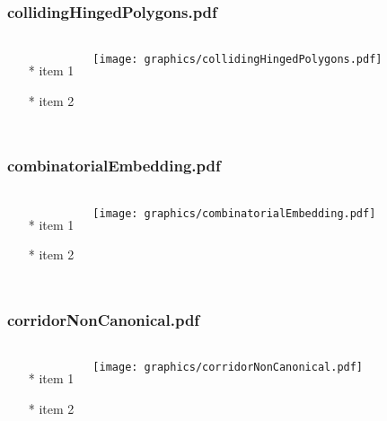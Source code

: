 \begin{frame} \frametitle{collidingHingedPolygons.pdf}
    \begin{columns}[c]
        \begin{itemize}
            \item[*] item 1
            \item[*] item 2
        \end{itemize}
        \begin{minipage}{\linewidth}
            \begin{center}
            \texttt{[image: graphics/collidingHingedPolygons.pdf]}
            \label{gfx:collidingHingedPolygons.pdf}
            \end{center}
        \end{minipage}
    \end{columns}
\end{frame}
\begin{frame} \frametitle{combinatorialEmbedding.pdf}
    \begin{columns}[c]
        \begin{itemize}
            \item[*] item 1
            \item[*] item 2
        \end{itemize}
        \begin{minipage}{\linewidth}
            \begin{center}
            \texttt{[image: graphics/combinatorialEmbedding.pdf]}
            \label{gfx:combinatorialEmbedding.pdf}
            \end{center}
        \end{minipage}
    \end{columns}
\end{frame}
\begin{frame} \frametitle{corridorNonCanonical.pdf}
    \begin{columns}[c]
        \begin{itemize}
            \item[*] item 1
            \item[*] item 2
        \end{itemize}
        \begin{minipage}{\linewidth}
            \begin{center}
            \texttt{[image: graphics/corridorNonCanonical.pdf]}
            \label{gfx:corridorNonCanonical.pdf}
            \end{center}
        \end{minipage}
    \end{columns}
\end{frame}
